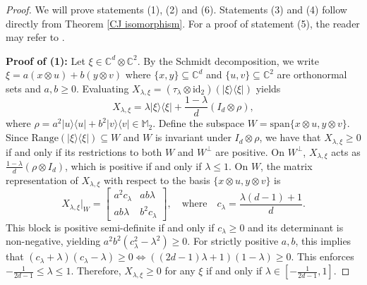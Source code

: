 \documentclass[11pt,reqno]{amsart}
\theoremstyle{definition}
\theoremstyle{plain}
\theoremstyle{remark}
\newcommand{\la}{\langle}
\newcommand{\ra}{\rangle}
\numberwithin{equation}{section}%
\begin{document}
  \begin{proof}
  	We will prove statements (1), (2) and (6). Statements (3) and (4) follow directly from Theorem \ref{CJ isomorphism}. For a proof of statement (5), the reader may refer to \cite{HH}.
  	
  	
  	
   \noindent\textbf{Proof of (1):} Let $\xi \in \mathbb{C}^d \otimes \mathbb{C}^2$. By the Schmidt decomposition, we write $\xi = a(x \otimes u) + b(y \otimes v)$ where $\{x, y\} \subseteq\mathbb{C}^d$ and $\{u, v\} \subseteq\mathbb{C}^2$ are orthonormal sets and $a, b \ge 0$. Evaluating $X_{\lambda,\xi} = (\tau_\lambda\otimes\text{id}_{2})(|\xi\ra\la\xi|)$ yields
  	\[
  	X_{\lambda,\xi} = \lambda|\xi\ra\la\xi| + \frac{1-\lambda}{d}(I_d\otimes \rho),
  	\]
  	where $\rho = a^2|u\ra\la u| + b^2|v\ra\la v|\in \mathbb{M}_2$. Define the subspace $W = \text{span}\{x \otimes u, y \otimes v\}$. Since $\text{Range}(|\xi\ra\la\xi|) \subseteq W$ and $W$ is invariant under $I_d\otimes \rho$, we have that $X_{\lambda,\xi} \ge 0$ if and only if its restrictions to both $W$ and $W^\perp$ are positive. On $W^\perp$, $X_{\lambda,\xi}$ acts as $\frac{1-\lambda}{d}(\rho \otimes I_d)$, which is positive if and only if $\lambda \le 1$. On $W$, the matrix representation of $X_{\lambda,\xi}$ with respect to the basis $\{x \otimes u, y \otimes v\}$ is
  	\[
  	X_{\lambda,\xi}|_W = \begin{bmatrix}
  		a^2 c_\lambda & a b \lambda\\
  		a b \lambda & b^2 c_\lambda
  	\end{bmatrix}, \quad \text{where} \quad c_\lambda= \frac{\lambda(d-1)+1}{d}.
  	\]
  	This block is positive semi-definite if and only if $c_\lambda \ge 0$ and its determinant is non-negative, yielding $a^2b^2(c_{\lambda}^2 - \lambda^2) \ge 0$. For strictly positive $a, b$, this implies that $(c_\lambda+\lambda)(c_\lambda-\lambda)\ge0\Leftrightarrow ((2d-1)\lambda+1)(1-\lambda)\ge0$. This enforces $-\frac{1}{2d-1}\le \lambda\le 1$. Therefore, $X_{\lambda,\xi} \ge 0$ for any $\xi$ if and only if $\lambda \in \left[-\frac{1}{2d-1},1\right]$.
  	
  	
  	

\end{proof}
\end{document}
